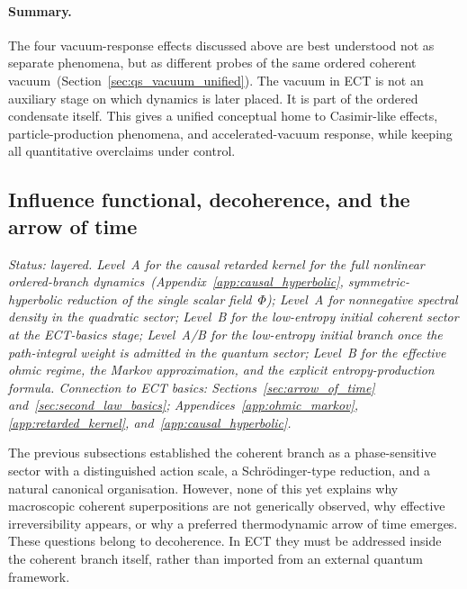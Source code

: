 \documentclass[11pt,a4paper]{article}
\numberwithin{equation}{section}
\begin{document}
\paragraph{Summary.}
The four vacuum-response effects discussed above are best understood
not as separate phenomena, but as different probes of the same ordered
coherent vacuum~(Section~\ref{sec:qs_vacuum_unified}).
The vacuum in ECT is not an auxiliary stage on which dynamics is later
placed.
It is part of the ordered condensate itself.
This gives a unified conceptual home to Casimir-like effects,
particle-production phenomena, and accelerated-vacuum response, while
keeping all quantitative overclaims under control.

\subsection{Influence functional, decoherence, and the arrow of time}
\label{sec:qs_decoherence}\label{sec:influence_functional}\label{sec:second_law}

\textit{Status: layered.
Level~A for the causal retarded kernel for the full nonlinear
ordered-branch dynamics~(Appendix~\ref{app:causal_hyperbolic},
symmetric-hyperbolic reduction of the single scalar field~$\Phi$);
Level~A for nonnegative spectral density in the quadratic sector;
Level~B for the low-entropy initial coherent sector at the ECT-basics
stage; Level~A/B for the low-entropy initial branch once the
path-integral weight is admitted in the quantum sector;
Level~B for the effective ohmic regime, the Markov approximation,
and the explicit entropy-production formula.
Connection to ECT basics:
Sections~\ref{sec:arrow_of_time} and~\ref{sec:second_law_basics};
Appendices~\ref{app:ohmic_markov}, \ref{app:retarded_kernel},
and~\ref{app:causal_hyperbolic}.}

\medskip
The previous subsections established the coherent branch as a
phase-sensitive sector with a distinguished action scale, a
Schr\"odinger-type reduction, and a natural canonical organisation.
However, none of this yet explains why macroscopic coherent
superpositions are not generically observed, why effective
irreversibility appears, or why a preferred thermodynamic arrow of
time emerges.
These questions belong to decoherence.
In ECT they must be addressed inside the coherent branch itself,
rather than imported from an external quantum framework.
\end{document}
